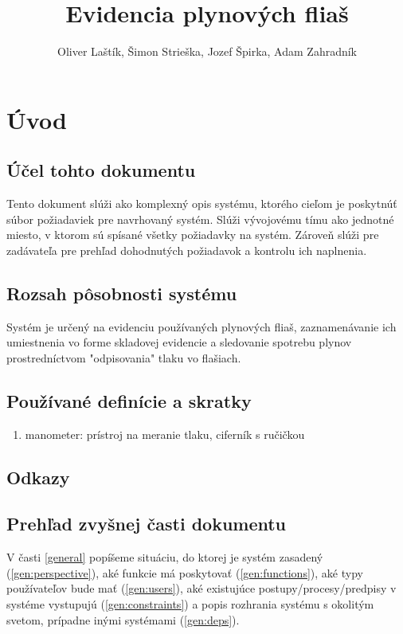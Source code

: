 \documentclass[hreffootnote]{zah}
\title{Evidencia plynových fliaš}
\author{Oliver Laštík, Šimon Strieška, Jozef Špirka, Adam Zahradník}
\begin{document}
\maketitle

\tableofcontents
\cleardoublepage

\section{Úvod}

\subsection{Účel tohto dokumentu}

Tento dokument slúži ako komplexný opis systému, ktorého cieľom je poskytnúť súbor požiadaviek pre navrhovaný systém. Slúži vývojovému tímu ako jednotné miesto, v ktorom sú spísané všetky požiadavky na systém. Zároveň slúži pre zadávateľa pre prehľad dohodnutých požiadavok a kontrolu ich naplnenia.

\subsection{Rozsah pôsobnosti systému}

Systém je určený na evidenciu používaných plynových fliaš, zaznamenávanie ich umiestnenia vo forme skladovej evidencie a sledovanie spotrebu plynov prostredníctvom "odpisovania" tlaku vo flašiach.

\subsection{Používané definície a skratky}

\begin{enumerate}
	\item manometer: prístroj na meranie tlaku, ciferník s ručičkou
\end{enumerate}

\subsection{Odkazy}

\subsection{Prehľad zvyšnej časti dokumentu}

V časti \ref{general} popíšeme situáciu, do ktorej je systém zasadený (\ref{gen:perspective}), aké funkcie má poskytovať (\ref{gen:functions}), aké typy používateľov bude mať (\ref{gen:users}), aké existujúce postupy/procesy/predpisy v systéme vystupujú (\ref{gen:constraints}) a popis rozhrania systému s okolitým svetom, prípadne inými systémami (\ref{gen:deps}).
\end{document}
